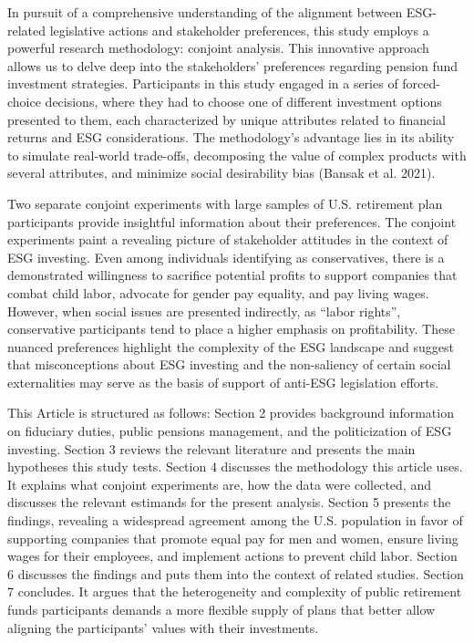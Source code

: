 \documentclass[
  12pt,
]{article}
\begin{document}
In pursuit of a comprehensive understanding of the alignment between ESG-related legislative actions and stakeholder preferences, this study employs a powerful research methodology: conjoint analysis. This innovative approach allows us to delve deep into the stakeholders' preferences regarding pension fund investment strategies. Participants in this study engaged in a series of forced-choice decisions, where they had to choose one of different investment options presented to them, each characterized by unique attributes related to financial returns and ESG considerations. The methodology's advantage lies in its ability to simulate real-world trade-offs, decomposing the value of complex products with several attributes, and minimize social desirability bias (Bansak et al. 2021).

Two separate conjoint experiments with large samples of U.S. retirement plan participants provide insightful information about their preferences. The conjoint experiments paint a revealing picture of stakeholder attitudes in the context of ESG investing. Even among individuals identifying as conservatives, there is a demonstrated willingness to sacrifice potential profits to support companies that combat child labor, advocate for gender pay equality, and pay living wages. However, when social issues are presented indirectly, as ``labor rights'', conservative participants tend to place a higher emphasis on profitability. These nuanced preferences highlight the complexity of the ESG landscape and suggest that misconceptions about ESG investing and the non-saliency of certain social externalities may serve as the basis of support of anti-ESG legislation efforts.

This Article is structured as follows: Section 2 provides background information on fiduciary duties, public pensions management, and the politicization of ESG investing. Section 3 reviews the relevant literature and presents the main hypotheses this study tests. Section 4 discusses the methodology this article uses. It explains what conjoint experiments are, how the data were collected, and discusses the relevant estimands for the present analysis. Section 5 presents the findings, revealing a widespread agreement among the U.S. population in favor of supporting companies that promote equal pay for men and women, ensure living wages for their employees, and implement actions to prevent child labor. Section 6 discusses the findings and puts them into the context of related studies. Section 7 concludes. It argues that the heterogeneity and complexity of public retirement funds participants demands a more flexible supply of plans that better allow aligning the participants' values with their investments.
\end{document}
